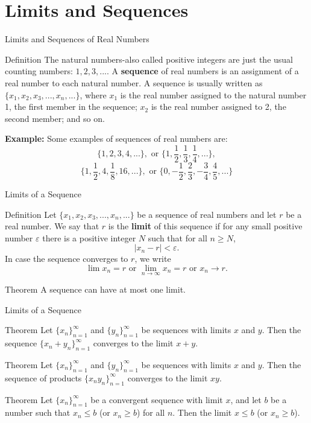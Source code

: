 \documentclass{beamer}
\begin{document}
\section{Limits and Sequences}
\begin{frame}{Limits and Sequences of Real Numbers}
    \begin{block}
{Definition} 
The natural numbers-also called positive integers are just the usual counting numbers: $1,2,3,...$. A \textbf{sequence } of real numbers is an assignment of a real number to each natural number. A sequence is usually written as $\{x_1, x_2, x_3,..., x_n,...\}$, where $x_1$ is the real number assigned to the natural number 1, the first member in the sequence; $x_2$ is the real number assigned to 2, the second member; and so on. 

    \end{block}
    \textbf{Example:} Some examples of sequences of real numbers are:
    \[\{1,2,3,4,...\}, \text{ or } \{1, \frac{1}{2}, \frac{1}{3}, \frac{1}{4},...\},
    \]
    \[\{1, \frac{1}{2}, 4, \frac{1}{8}, 16,...\}, \text{ or } \{ 0, -\frac{1}{2}, \frac{2}{3}, -\frac{3}{4}, \frac{4}{5},...\}
    \]
        
\end{frame}
\begin{frame}{Limits of a Sequence}
\begin{block}{Definition}
Let $\{x_1, x_2, x_3,..., x_n,...\}$ be a sequence of real numbers and let $r$ be a real number. We say that $r$ is the \textbf{limit} of this sequence if for any small positive number $\varepsilon$ there is a positive integer $N$ such that for all $n\geq N$,
\[|x_n-r|<\varepsilon.
\]
In case the sequence converges to $r$, we write 
\[\lim x_n=r \text{ or } \lim_{n\to \infty}x_n=r \text{ or }x_n\to r.
\]
\end{block}
\begin{block}{Theorem}
A sequence can have at most one limit. 
\end{block}        
\end{frame}
\begin{frame}{Limits of a Sequence}
\begin{block}{Theorem}
Let $\{x_n\}_{n=1}^\infty$ and $\{y_n\}_{n=1}^\infty$ be sequences with limits $x$ and $y$. Then the sequence $\{x_n+y_n\}_{n=1}^\infty$ converges to the limit $x+y$.
\end{block}
\begin{block}{Theorem}
Let $\{x_n\}_{n=1}^\infty$ and $\{y_n\}_{n=1}^\infty$ be sequences with limits $x$ and $y$. Then the sequence of products $\{x_ny_n\}_{n=1}^\infty$ converges to the limit $xy$.
\end{block}
\begin{block}{Theorem}
Let $\{x_n\}_{n=1}^\infty$ be a convergent  sequence with limit $x$, and let $b$ be a number such that $x_n\leq b$ (or $x_n\geq b$) for all $n$. Then  the limit $x\leq b$ (or $x_n\geq b$).
\end{block}
\end{frame}
\end{document}
